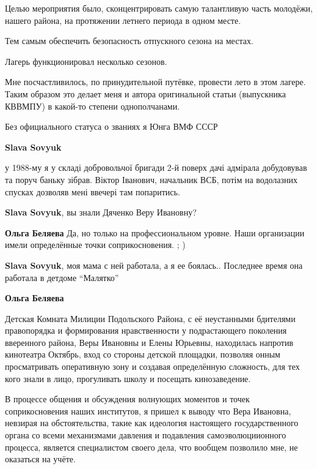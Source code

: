 \begin{itemize}
Целью мероприятия было, сконцентрировать самую талантливую часть молодёжи,
нашего района, на протяжении летнего периода в одном месте.

Тем самым обеспечить безопасность отпускного сезона на местах.

Лагерь функционировал несколько сезонов.

Мне посчастливилось, по принудительной путёвке, провести лето в этом лагере.
Таким образом это делает меня и автора оригинальной статьи (выпускника КВВМПУ)
в какой-то степени однополчанами.

Без официального статуса о званиях я Юнга ВМФ СССР

\begin{itemize} %
\textbf{Slava Sovyuk} 

у 1988-му я у складі добровольчої бригади 2-й поверх дачі адмірала добудовував
та поруч баньку зібрав. Віктор Іванович, начальник ВСБ, потім на водолазних
спусках дозволяв мені ввечері там попаритись.


\textbf{Slava Sovyuk}, вы знали Дяченко Веру Ивановну?

\textbf{Ольга Беляева}
Да, но только на профессиональном уровне.
Наши организации имели определённые точки соприкосновения. ; )

\textbf{Slava Sovyuk}, моя мама с ней работала, а я ее боялась.. Последнее время она работала в детдоме \enquote{Малятко}

\textbf{Ольга Беляева}

Детская Комната Милиции Подольского Района, с её неустанными бдителями
правопорядка и формирования нравственности у подрастающего поколения вверенного
района, Веры Ивановны и Елены Юрьевны, находилась напротив кинотеатра Октябрь,
вход со стороны детской площадки, позволяя онным просматривать оперативную зону
и создавая определённую сложность, для тех кого знали в лицо, прогуливать школу
и посещать кинозаведение.

В процессе общения и обсуждения волнующих моментов и точек соприкосновения
наших институтов, я пришел к выводу что Вера Ивановна, невзирая на
обстоятельства, такие как идеология настоящего государственного органа со всеми
механизмами давления и подавления самоэволюциионного процесса, является
специалистом своего дела, что вообщем позволило мне, не оказаться на учёте.

\end{itemize} %


\end{itemize}
